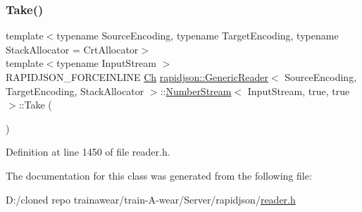 \subsubsection{\texorpdfstring{Take()}{Take()}}
{\footnotesize\ttfamily template$<$typename Source\+Encoding, typename Target\+Encoding, typename Stack\+Allocator = Crt\+Allocator$>$ \\
template$<$typename Input\+Stream $>$ \\
R\+A\+P\+I\+D\+J\+S\+O\+N\+\_\+\+F\+O\+R\+C\+E\+I\+N\+L\+I\+NE \mbox{\hyperlink{classrapidjson_1_1_generic_reader_1_1_number_stream_3_01_input_stream_00_01false_00_01false_01_4_a2a945ef08d04099027c32f72821a12c0}{Ch}} \mbox{\hyperlink{classrapidjson_1_1_generic_reader}{rapidjson\+::\+Generic\+Reader}}$<$ Source\+Encoding, Target\+Encoding, Stack\+Allocator $>$\+::\mbox{\hyperlink{classrapidjson_1_1_generic_reader_1_1_number_stream}{Number\+Stream}}$<$ Input\+Stream, true, true $>$\+::Take (\begin{DoxyParamCaption}{ }\end{DoxyParamCaption})}



Definition at line 1450 of file reader.\+h.


\begin{DoxyCode}{0}

\end{DoxyCode}


The documentation for this class was generated from the following file\+:\begin{DoxyCompactItemize}
\item 
D\+:/cloned repo trainawear/train-\/\+A-\/wear/\+Server/rapidjson/\mbox{\hyperlink{reader_8h}{reader.\+h}}\end{DoxyCompactItemize}
